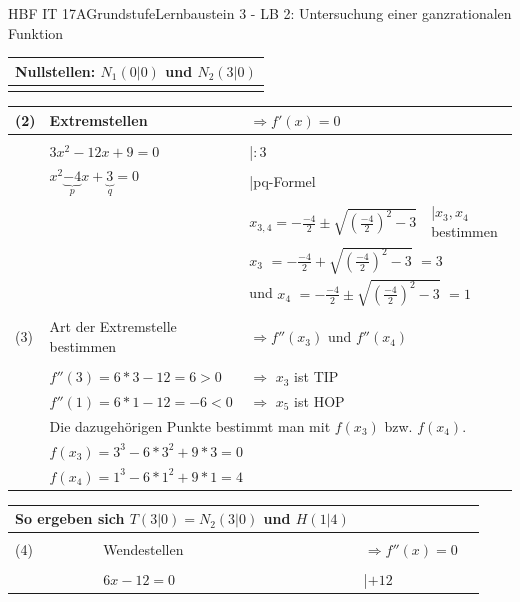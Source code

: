 \documentclass[oneside,openany,headings=optiontotoc,11pt,numbers=noenddot]{scrreprt}
\begin{document}
\begin{worksheet}{HBF IT 17A}{Grundstufe}{Lernbaustein 3 - LB 2: Untersuchung einer ganzrationalen Funktion}
\begin{framed}
\begin{tabularx}{\textwidth}{lXXl}
				\multicolumn{4}{l}{Nullstellen: \colorbox{blue!5}{\(N_1(0|0)\)} und \colorbox{blue!5}{\(N_2(3|0)\)}}\\
				\hline\hline\\
			\end{tabularx}
			\begin{tabularx}{\textwidth}{lXXl}
				(2) & Extremstellen & \(\Rightarrow f'(x) = 0\)\\
				\hline\\
				& \(3x^2 -12x+9 = 0\) & |\(:3\)\\
				& \(x^2 \underbrace{-4}_{p}x +\underbrace{3}_{q} = 0\) & |pq-Formel\\
				& & \(x_{3,4} = -\frac{-4}{2} \pm \sqrt{\left(\frac{-4}{2}\right)^2 -3}\) & |\(x_3,x_4\) bestimmen\\
				& & \multicolumn{2}{l}{\colorbox{green!10}{\(x_3\)} \(= -\frac{-4}{2} + \sqrt{\left(\frac{-4}{2}\right)^2 -3}\) \colorbox{green!10}{\(= 3\)}}\\
				& & \multicolumn{2}{l}{und \colorbox{green!10}{\(x_4\)} \(= -\frac{-4}{2} \pm \sqrt{\left(\frac{-4}{2}\right)^2 -3}\) \colorbox{green!10}{\(= 1\)}}\\
				\\
				(3) & Art der Extremstelle bestimmen & \(\Rightarrow f''(x_3)\) und \(f''(x_4)\)\\
				\hline\\				 
				& \(f''(3) =  6*3 -12 = 6 > 0\) & \(\Rightarrow\) \colorbox{green!10}{\(x_3\) ist TIP}\\
				& \(f''(1) = 6*1 -12 = -6 < 0\) & \(\Rightarrow\) \colorbox{green!10}{\(x_5\) ist HOP}\\
				& \multicolumn{3}{l}{Die dazugehörigen Punkte bestimmt man mit \(f(x_3)\) bzw. \(f(x_4)\).}\\
				& \multicolumn{2}{l}{\(f(x_3) = 3^3 -6*3^2 +9*3 = 0\)}\\
				& \multicolumn{2}{l}{\(f(x_4) = 1^3 -6*1^2 +9*1 = 4\)}\\
			\end{tabularx}
			\begin{tabularx}{\textwidth}{lXXl}
				\multicolumn{2}{l}{So ergeben sich \colorbox{blue!5}{\(T(3|0) = N_2(3|0)\)} und \colorbox{blue!5}{\(H(1|4)\)}}\\
				\hline\hline\\
				(4) & Wendestellen & \(\Rightarrow f''(x) = 0\)\\
				\hline\\
				& \(6x -12 = 0\) & |\(+12\)\\

\end{tabularx}
\end{framed}
\end{worksheet}
\end{document}
